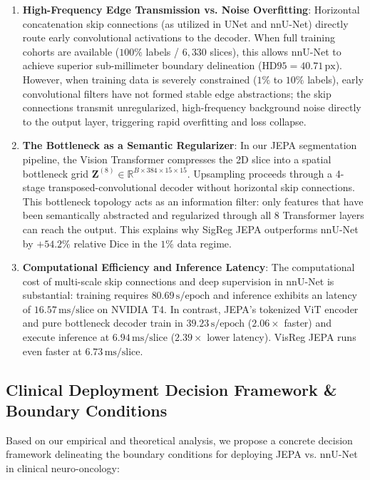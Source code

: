\documentclass{article}
\begin{document}
\begin{enumerate}
    \item \textbf{High-Frequency Edge Transmission vs. Noise Overfitting}:
    Horizontal concatenation skip connections (as utilized in UNet and nnU-Net) directly route early convolutional activations to the decoder. When full training cohorts are available ($100\%$ labels / $6,330$ slices), this allows nnU-Net to achieve superior sub-millimeter boundary delineation ($\text{HD95} = 40.71\,\text{px}$). However, when training data is severely constrained ($1\%$ to $10\%$ labels), early convolutional filters have not formed stable edge abstractions; the skip connections transmit unregularized, high-frequency background noise directly to the output layer, triggering rapid overfitting and loss collapse.
    
    \item \textbf{The Bottleneck as a Semantic Regularizer}:
    In our JEPA segmentation pipeline, the Vision Transformer compresses the 2D slice into a spatial bottleneck grid $\mathbf{Z}^{(8)} \in \mathbb{R}^{B \times 384 \times 15 \times 15}$. Upsampling proceeds through a 4-stage transposed-convolutional decoder without horizontal skip connections. This bottleneck topology acts as an information filter: only features that have been semantically abstracted and regularized through all 8 Transformer layers can reach the output. This explains why SigReg JEPA outperforms nnU-Net by $+54.2\%$ relative Dice in the $1\%$ data regime.
    
    \item \textbf{Computational Efficiency and Inference Latency}:
    The computational cost of multi-scale skip connections and deep supervision in nnU-Net is substantial: training requires $80.69\,\text{s/epoch}$ and inference exhibits an latency of $16.57\,\text{ms/slice}$ on NVIDIA T4. In contrast, JEPA's tokenized ViT encoder and pure bottleneck decoder train in $39.23\,\text{s/epoch}$ ($2.06\times$ faster) and execute inference at $6.94\,\text{ms/slice}$ ($2.39\times$ lower latency). VisReg JEPA runs even faster at $6.73\,\text{ms/slice}$.
\end{enumerate}

\subsection{Clinical Deployment Decision Framework \& Boundary Conditions}

Based on our empirical and theoretical analysis, we propose a concrete decision framework delineating the boundary conditions for deploying JEPA vs. nnU-Net in clinical neuro-oncology:
\end{document}
